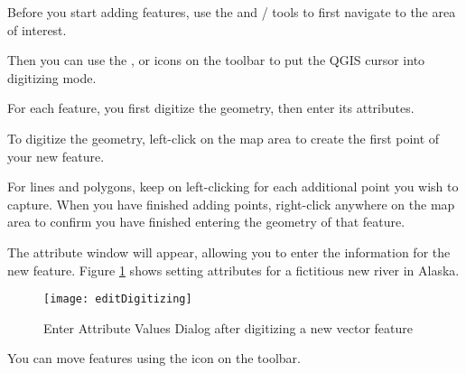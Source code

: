 
Before you start adding features, use the 
and / 
tools to first navigate to the area of interest.

Then you can use the ,
 or
 icons on the toolbar to put the QGIS cursor
into digitizing mode.

For each feature, you first digitize the geometry, then enter its attributes.

To digitize the geometry, left-click on the map area to create the
first point of your new feature.

For lines and polygons, keep on left-clicking for each additional
point you wish to capture.  When you have finished adding points,
right-click anywhere on the map area to confirm you have finished entering
the geometry of that feature.

The attribute window will appear, allowing you to enter the information for the new feature.
Figure \ref{fig:vector_digitising} shows setting attributes for a fictitious
new river in Alaska.

\begin{figure}[ht]
   \begin{center}
   \caption{Enter Attribute Values Dialog after digitizing a new vector
   feature \nixcaption}\label{fig:vector_digitising}\smallskip
   \texttt{[image: editDigitizing]}
\end{center}  
\end{figure}

\begin{Tip}[ht]\caption{\textsc{Attribute Value Types}}
\end{Tip}


You can move features using the  icon
on the toolbar.

